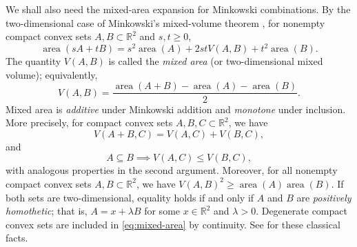 \documentclass[reqno, 11pt]{article}
\numberwithin{equation}{section}
\theoremstyle{definition}
\DeclareMathOperator{\area}{area}
\numberwithin{equation}{section}
\begin{document}
We shall also need the mixed-area expansion for Minkowski combinations.
By the two-dimensional case of Minkowski's mixed-volume theorem \cite{Gardner2002}, for nonempty compact convex sets 
$A,B\subset\mathbb{R}^2$ and $s,t\ge 0$,
\begin{equation}\label{eq:mixed-area}
 \area(sA+tB)=s^2\area(A)+2stV(A,B)+t^2\area(B).
\end{equation}
The quantity $V(A,B)$ is called the \emph{mixed area}
(or two-dimensional mixed volume); equivalently,
\[
V(A,B)=\frac{\area(A+B)-\area(A)-\area(B)}{2}.
\]
Mixed area is \emph{additive} under Minkowski addition and \emph{monotone} under inclusion. More precisely, for compact convex sets \(A,B,C\subset\mathbb R^2\), we have 
\[
V(A+B,C)=V(A,C)+V(B,C),
\]
and
\[
A\subseteq B\implies V(A,C)\le V(B,C),
\]
with analogous properties in the second argument. Moreover, for all nonempty compact convex sets \(A,B\subset\mathbb R^2\), we have $V(A,B)^2\ge\operatorname{area}(A)\operatorname{area}(B)$.
If both sets are two-dimensional, equality holds if and only if $A$ and $B$ are \emph{positively homothetic}; that is, $A=x+\lambda B$ for some $x\in\mathbb R^2$ and $\lambda>0$. Degenerate compact
convex sets are included in \eqref{eq:mixed-area} by continuity.
See \cite[Sections~3--5]{Gardner2002} for these classical facts.
\end{document}
